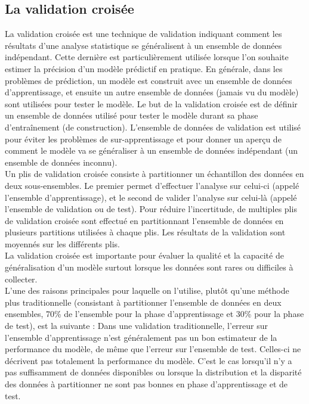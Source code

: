     \subsection{La validation croisée}
    \label{annexe:cv}
        La validation croisée est une technique de validation indiquant comment les résultats d'une analyse statistique se généralisent à un ensemble de données indépendant. Cette dernière est particulièrement utilisée lorsque l'on souhaite estimer la précision d'un modèle prédictif en pratique. En générale, dans les problèmes de prédiction, un modèle est construit avec un ensemble de données d'apprentissage, et ensuite un autre ensemble de données (jamais vu du modèle) sont utilisées pour tester le modèle. Le but de la validation croisée est de définir un ensemble de données utilisé pour tester le modèle durant sa phase d’entraînement (de construction). L'ensemble de données de validation est utilisé pour éviter les problèmes de sur-apprentissage et pour donner un aperçu de comment le modèle va se généraliser à un ensemble de données indépendant (un ensemble de données inconnu).\\

        Un plis de validation croisée consiste à partitionner un échantillon des données en deux sous-ensembles. Le premier permet d'effectuer l'analyse sur celui-ci (appelé l'ensemble d'apprentissage), et le second de valider l'analyse sur celui-là (appelé l'ensemble de validation ou de test). Pour réduire l'incertitude, de multiples plis de validation croisée sont effectué en partitionnant l'ensemble de données en plusieurs partitions utilisées à chaque plis. Les résultats de la validation sont moyennés sur les différents plis.\\

        La validation croisée est importante pour évaluer la qualité et la capacité de généralisation d'un modèle surtout lorsque les données sont rares ou difficiles à collecter.\\

        L'une des raisons principales pour laquelle on l'utilise, plutôt qu'une méthode plus traditionnelle (consistant à partitionner l'ensemble de données en deux ensembles, 70\% de l'ensemble pour la phase d'apprentissage et 30\% pour la phase de test), est la suivante : Dans une validation traditionnelle, l'erreur sur l'ensemble d'apprentissage n'est généralement pas un bon estimateur de la performance du modèle, de même que l'erreur sur l'ensemble de test. Celles-ci ne décrivent pas totalement la performance du modèle. C'est le cas lorsqu'il n'y a pas suffisamment de données disponibles ou lorsque la distribution et la disparité des données à partitionner ne sont pas bonnes en phase d'apprentissage et de test.\\

